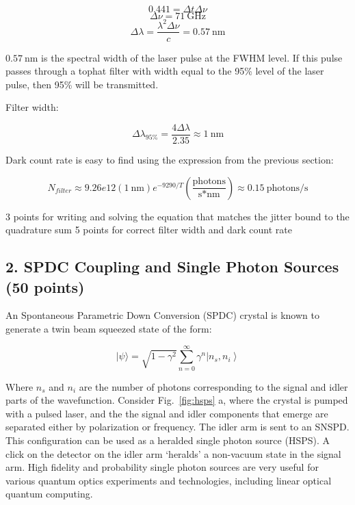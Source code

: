 \documentclass[12pt]{caltech_thesis}
\begin{document}
\begin{enumerate}
{  }

  {\color{midnightblue} 

  \[ 0.441 = \Delta t \Delta \nu \] \[\Delta \nu = 71~\text{GHz}\]
  \[\Delta \lambda = \frac{\lambda^2 \Delta \nu}{c} = 0.57~\text{nm}\]

  }

  {\color{midnightblue}  \(0.57~\text{nm}\) is the spectral width of the
  laser pulse at the FWHM level. If this pulse passes through a tophat
  filter with width equal to the 95\% level of the laser pulse, then
  95\% will be transmitted. }

  {\color{midnightblue} Filter width: }

  {\color{midnightblue} 

  \[\Delta \lambda_{95\%} = \frac{4 \Delta \lambda}{2.35} \approx \boxed{1~\text{nm}} \]

  }

  {\color{midnightblue} Dark count rate is easy to find using the
  expression from the previous section: }

  {\color{midnightblue} 

  \[\boxed{N_{filter} \approx 9.26e12 (1~\text{nm}) e^{-9290/T} (\frac{\text{photons}}{\text{s*nm}})} \approx 0.15~\text{photons/s} \]

  }

  {\color{darkred} 3 points for writing and solving the equation that
  matches the jitter bound to the quadrature sum } {\color{darkred} 5
  points for correct filter width and dark count rate}
\end{enumerate}

\hypertarget{spdc-coupling-and-single-photon-sources-50-points}{%
\subsection{2. SPDC Coupling and Single Photon Sources (50
points)}\label{spdc-coupling-and-single-photon-sources-50-points}}

An Spontaneous Parametric Down Conversion (SPDC) crystal is known to
generate a twin beam squeezed state of the form:

\[|\psi\rangle= \sqrt{1 - \gamma^2} \sum_{n=0}^{\infty} \gamma^{n}\left|n_{s}, n_{i}\right\rangle \]

Where \(n_s\) and \(n_i\) are the number of photons corresponding to the
signal and idler parts of the wavefunction. Consider Fig.~\ref{fig:hsps}
a, where the crystal is pumped with a pulsed laser, and the the signal
and idler components that emerge are separated either by polarization or
frequency. The idler arm is sent to an SNSPD. This configuration can be
used as a heralded single photon source (HSPS). A click on the detector
on the idler arm `heralds' a non-vacuum state in the signal arm. High
fidelity and probability single photon sources are very useful for
various quantum optics experiments and technologies, including linear
optical quantum computing.
\end{document}
